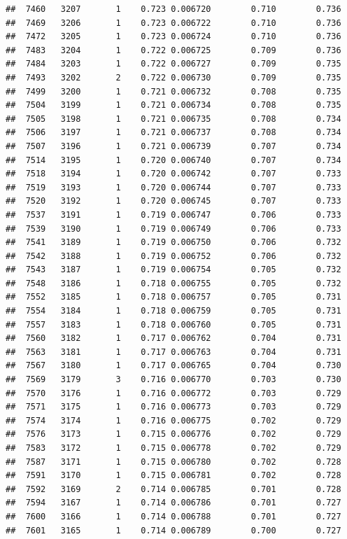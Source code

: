\documentclass[
]{book}
\begin{document}
\begin{verbatim}
##  7460   3207       1    0.723 0.006720        0.710        0.736
##  7469   3206       1    0.723 0.006722        0.710        0.736
##  7472   3205       1    0.723 0.006724        0.710        0.736
##  7483   3204       1    0.722 0.006725        0.709        0.736
##  7484   3203       1    0.722 0.006727        0.709        0.735
##  7493   3202       2    0.722 0.006730        0.709        0.735
##  7499   3200       1    0.721 0.006732        0.708        0.735
##  7504   3199       1    0.721 0.006734        0.708        0.735
##  7505   3198       1    0.721 0.006735        0.708        0.734
##  7506   3197       1    0.721 0.006737        0.708        0.734
##  7507   3196       1    0.721 0.006739        0.707        0.734
##  7514   3195       1    0.720 0.006740        0.707        0.734
##  7518   3194       1    0.720 0.006742        0.707        0.733
##  7519   3193       1    0.720 0.006744        0.707        0.733
##  7520   3192       1    0.720 0.006745        0.707        0.733
##  7537   3191       1    0.719 0.006747        0.706        0.733
##  7539   3190       1    0.719 0.006749        0.706        0.733
##  7541   3189       1    0.719 0.006750        0.706        0.732
##  7542   3188       1    0.719 0.006752        0.706        0.732
##  7543   3187       1    0.719 0.006754        0.705        0.732
##  7548   3186       1    0.718 0.006755        0.705        0.732
##  7552   3185       1    0.718 0.006757        0.705        0.731
##  7554   3184       1    0.718 0.006759        0.705        0.731
##  7557   3183       1    0.718 0.006760        0.705        0.731
##  7560   3182       1    0.717 0.006762        0.704        0.731
##  7563   3181       1    0.717 0.006763        0.704        0.731
##  7567   3180       1    0.717 0.006765        0.704        0.730
##  7569   3179       3    0.716 0.006770        0.703        0.730
##  7570   3176       1    0.716 0.006772        0.703        0.729
##  7571   3175       1    0.716 0.006773        0.703        0.729
##  7574   3174       1    0.716 0.006775        0.702        0.729
##  7576   3173       1    0.715 0.006776        0.702        0.729
##  7583   3172       1    0.715 0.006778        0.702        0.729
##  7587   3171       1    0.715 0.006780        0.702        0.728
##  7591   3170       1    0.715 0.006781        0.702        0.728
##  7592   3169       2    0.714 0.006785        0.701        0.728
##  7594   3167       1    0.714 0.006786        0.701        0.727
##  7600   3166       1    0.714 0.006788        0.701        0.727
##  7601   3165       1    0.714 0.006789        0.700        0.727

\end{verbatim}
\end{document}
